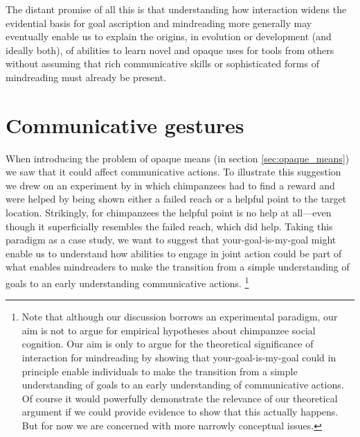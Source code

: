 \documentclass[12pt,\papersize]{extarticle}
\begin{document}
The distant promise of all this is that 
understanding how interaction widens the evidential basis for goal ascription and mindreading more generally 
may eventually enable us to explain
the origins, in evolution or development (and ideally both), of abilities to learn novel and opaque uses for tools from others 
without assuming that 
rich communicative skills
or 
sophisticated forms of mindreading 
must already be  present.



\section{Communicative gestures}
\label{sec:communicative_gestures}
When introducing the problem of opaque means 
(in section \vref{sec:opaque_means})
we saw that it could  affect
communicative actions.
To illustrate this suggestion we drew on 
an experiment by \citet{hare_chimpanzees_2004}
in which chimpanzees had to find a reward 
and were helped by being shown either a failed reach or  a helpful point to the target location.
Strikingly, for chimpanzees the helpful point is no help at all---even though it superficially resembles the failed reach, which  did help.
Taking this paradigm as a case study, 
we want to suggest that your-goal-is-my-goal might 
enable us to understand how abilities to engage in joint action 
could be part of what enables mindreaders to make the transition from 
a simple understanding of goals 
to 
an early understanding communicative actions.%
\footnote{
Note that although our discussion borrows an experimental paradigm,
our aim is not to argue for empirical hypotheses about chimpanzee social cognition.
Our aim is only to argue for the theoretical significance of interaction for mindreading by showing 
that your-goal-is-my-goal
could {in principle} enable
individuals to make the transition 
from
 a simple understanding of goals
to
 an early understanding of communicative actions.
Of course it would powerfully demonstrate the relevance of our theoretical argument if we could provide evidence to show that this actually happens.
But for now we are concerned with more narrowly conceptual issues.
}
\end{document}
